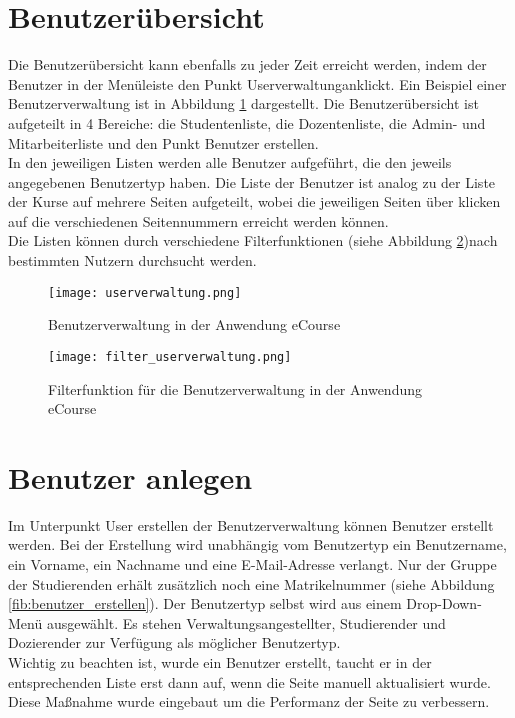 \section{Benutzerübersicht}
Die Benutzerübersicht kann ebenfalls zu jeder Zeit erreicht werden, indem der Benutzer in der Menüleiste den Punkt \glqq Userverwaltung\grqq anklickt. Ein Beispiel einer Benutzerverwaltung ist in Abbildung \ref{fib:userverwaltung} dargestellt.
Die Benutzerübersicht ist aufgeteilt in 4 Bereiche: die Studentenliste, die Dozentenliste, die Admin- und Mitarbeiterliste und den Punkt Benutzer erstellen. \\
In den jeweiligen Listen werden alle Benutzer aufgeführt, die den jeweils angegebenen Benutzertyp haben. Die Liste der Benutzer ist analog zu der Liste der Kurse auf mehrere Seiten aufgeteilt, wobei die jeweiligen Seiten über klicken auf die verschiedenen Seitennummern erreicht werden können.\\
Die Listen können durch verschiedene Filterfunktionen (siehe Abbildung \ref{fib:filter})nach bestimmten Nutzern durchsucht werden. 
\begin{figure}[h]
\centering
\texttt{[image: userverwaltung.png]}
\caption{Benutzerverwaltung in der Anwendung eCourse}
\label{fib:userverwaltung}
\end{figure}

\begin{figure}[h]
\centering
\texttt{[image: filter\_userverwaltung.png]}
\caption{Filterfunktion für die Benutzerverwaltung in der Anwendung eCourse}
\label{fib:filter}
\end{figure}


\section{Benutzer anlegen}
Im Unterpunkt \glqq User erstellen\grqq\: der Benutzerverwaltung können Benutzer erstellt werden. Bei der Erstellung wird unabhängig vom Benutzertyp ein Benutzername, ein Vorname, ein Nachname und eine E-Mail-Adresse verlangt. Nur der Gruppe der Studierenden erhält zusätzlich noch eine Matrikelnummer (siehe Abbildung \ref{fib:benutzer_erstellen}). Der Benutzertyp selbst wird aus einem Drop-Down-Menü ausgewählt. Es stehen Verwaltungsangestellter, Studierender und Dozierender zur Verfügung als möglicher Benutzertyp. \\
Wichtig zu beachten ist, wurde ein Benutzer erstellt, taucht er in der entsprechenden Liste erst dann auf, wenn die Seite manuell aktualisiert wurde. Diese Maßnahme wurde eingebaut um die Performanz der Seite zu verbessern.

